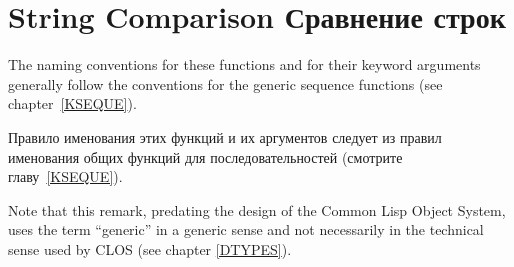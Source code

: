 \section{String Comparison Сравнение строк}

The naming conventions for these functions and for their keyword
arguments generally follow the conventions for the generic sequence
functions (see chapter~\ref{KSEQUE}).

Правило именования этих функций и их аргументов следует из правил именования
общих функций для последовательностей (смотрите главу~\ref{KSEQUE}).

\begin{new}
Note that this remark, predating the design of the Common Lisp Object System,
uses the term ``generic'' in a generic sense and not necessarily
in the technical sense used by CLOS
(see chapter \ref{DTYPES}).
\end{new}


